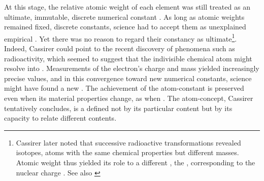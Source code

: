 \documentclass[submitted,12pt]{article}
\begin{document}
At this stage, the relative atomic weight of each element was still treated as an ultimate, immutable, discrete numerical constant . As long as atomic weights remained fixed, discrete constants, science had to accept them as unexplained empirical  . Yet there was no reason to regard their constancy as ultimate\footnote{Cassirer later noted that successive radioactive transformations revealed isotopes, atoms with the same chemical properties but different masses. Atomic weight thus yielded its role to a different , the , corresponding to the nuclear charge . See also \cite{Cassirer1936a}}. Indeed, Cassirer could point to the recent discovery of phenomena such as radioactivity, which seemed to suggest that the indivisible chemical atom might resolve into  . Measurements of the electron's charge and mass yielded increasingly precise values, and in this convergence toward new numerical constants, science might have found a new  . The achievement  of the atom-constant is preserved even when its material properties change, as when  . The atom-concept, Cassirer tentatively concludes, is a    defined not by its particular content but by its capacity to relate different contents.

% 




\end{document}
